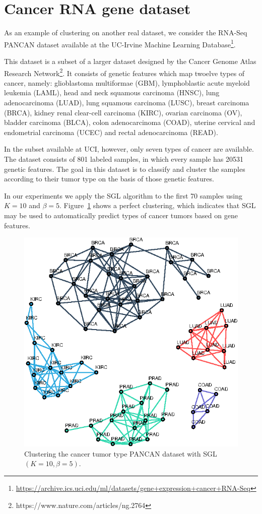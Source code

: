 \section{Cancer RNA gene dataset}

As an example of clustering on another real dataset, we consider the RNA-Seq
PANCAN dataset available at the UC-Irvine Machine Learning Database\footnote{\url{https://archive.ics.uci.edu/ml/datasets/gene+expression+cancer+RNA-Seq}}.

This dataset is a subset of a larger dataset designed by the Cancer Genome Atlas
Research Network\footnote{https://www.nature.com/articles/ng.2764}. It consists
of genetic features which map twoelve types of cancer, namely:
glioblastoma multiformae (GBM), lymphoblastic acute myeloid leukemia (LAML), head and neck squamous carcinoma (HNSC),
lung adenocarcinoma (LUAD), lung squamous carcinoma (LUSC), breast carcinoma (BRCA), kidney renal clear-cell carcinoma (KIRC),
ovarian carcinoma (OV), bladder carcinoma (BLCA), colon adenocarcinoma (COAD), uterine cervical and endometrial carcinoma (UCEC)
and rectal adenocarcinoma (READ).

In the subset available at UCI, however, only seven types of cancer are available.
The dataset consists of 801 labeled samples, in which every sample has 20531 genetic
features. The goal in this dataset is to classify and cluster the samples according to
their tumor type on the basis of those genetic features.

In our experiments we apply the \textsf{SGL} algorithm to the first 70 samples using
$K = 10$ and $\beta = 5$. Figure~\ref{fig:cancer-gene-sgl} shows a perfect clustering,
which indicates that \textsf{SGL} may be used to automatically predict types of cancer tumors
based on gene features.

\begin{figure}
  \centering
  \includegraphics[width=.475\textwidth]{cancer-rna/latex/figures/cancer-rna-graph-subset.eps}
  \caption{Clustering the cancer tumor type \textsf{PANCAN} dataset with \textsf{SGL}$(K = 10, \beta = 5)$.}
  \label{fig:cancer-gene-sgl}
\end{figure}
